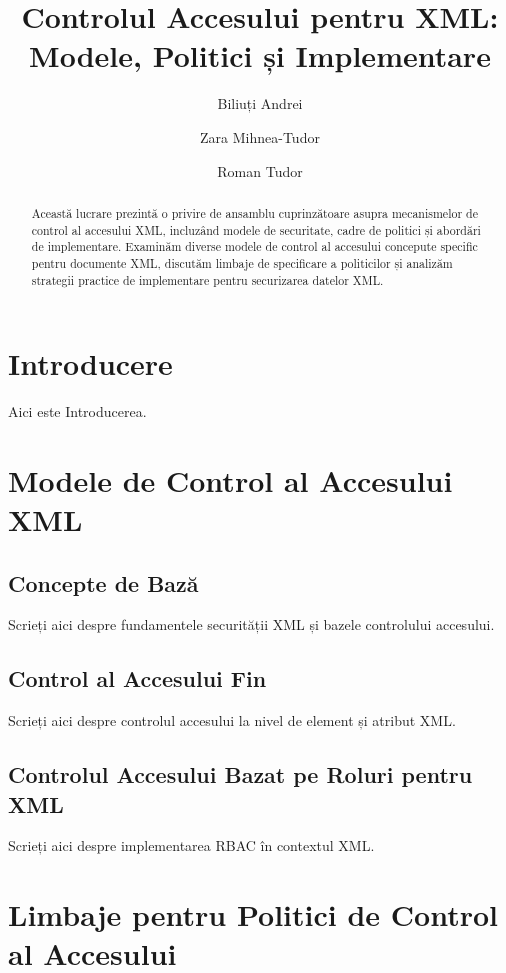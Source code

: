 \documentclass[runningheads]{llncs}
\begin{document}
\title{Controlul Accesului pentru XML: Modele, Politici și Implementare}
\author{Biliuți Andrei \and Zara Mihnea-Tudor \and Roman Tudor}
\maketitle
\begin{spacing}{1.5}
\begin{abstract}
Această lucrare prezintă o privire de ansamblu cuprinzătoare asupra mecanismelor de control al accesului XML, incluzând modele de securitate, cadre de politici și abordări de implementare. Examinăm diverse modele de control al accesului concepute specific pentru documente XML, discutăm limbaje de specificare a politicilor și analizăm strategii practice de implementare pentru securizarea datelor XML.
\end{abstract}

\section{Introducere}
Aici este Introducerea.

\section{Modele de Control al Accesului XML}

\subsection{Concepte de Bază}
Scrieți aici despre fundamentele securității XML și bazele controlului accesului.

\subsection{Control al Accesului Fin}
Scrieți aici despre controlul accesului la nivel de element și atribut XML.

\subsection{Controlul Accesului Bazat pe Roluri pentru XML}
Scrieți aici despre implementarea RBAC în contextul XML.

\section{Limbaje pentru Politici de Control al Accesului}


\end{spacing}
\end{document}
